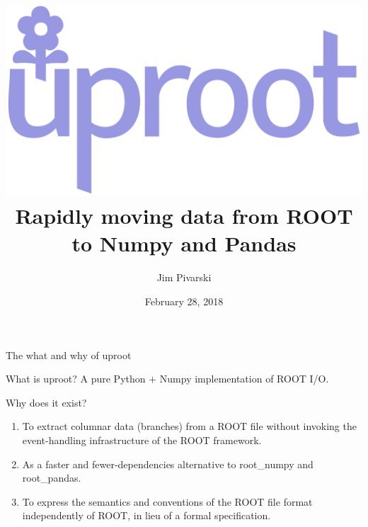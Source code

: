 \documentclass[aspectratio=169]{beamer}
\title[2018-02-28-iml-uproot]{\vspace{0.5 cm} \\ \includegraphics[width=0.25\linewidth]{uproot-logo.pdf} \\ Rapidly moving data from ROOT to Numpy and Pandas}
\author{Jim Pivarski}
\institute{Princeton University -- DIANA-HEP}
\date{February 28, 2018}
\begin{document}

\begin{frame}
  \titlepage
\end{frame}




\begin{frame}{The what and why of uproot}
\vspace{0.5 cm}

\begin{block}{What is uproot?}
A pure Python $+$ Numpy implementation of ROOT I/O.
\end{block}

\vspace{0.5 cm}
\begin{block}{Why does it exist?}
\begin{enumerate}
\item To extract columnar data (branches) from a ROOT file without invoking the event-handling infrastructure of the ROOT framework.
\item As a faster and fewer-dependencies alternative to root\_numpy and root\_pandas.
\item To express the semantics and conventions of the ROOT file format independently of ROOT, in lieu of a formal specification.
\end{enumerate}
\end{block}
\end{frame}
\end{document}
